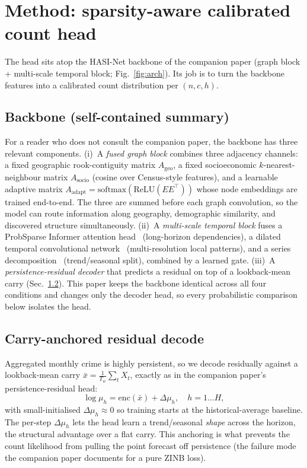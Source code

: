 \documentclass[11pt,conference]{IEEEtran}
\newcommand{\Ageo}{A_{\mathrm{geo}}}
\newcommand{\Asocio}{A_{\mathrm{socio}}}
\newcommand{\Aadapt}{A_{\mathrm{adapt}}}
\begin{document}
\section{Method: sparsity-aware calibrated count head}\label{sec:method}
The head sits atop the HASI-Net backbone of the companion paper (graph block +
multi-scale temporal block; Fig.~\ref{fig:arch}). Its job is to turn the backbone
features into a calibrated count distribution per $(n,c,h)$.

\subsection{Backbone (self-contained summary)}\label{sec:backbone}
For a reader who does not consult the companion paper, the backbone has three
relevant components. (i)~A \emph{fused graph block} combines three adjacency
channels: a fixed geographic rook-contiguity matrix $\Ageo$, a fixed
socioeconomic $k$-nearest-neighbour matrix $\Asocio$ (cosine over Census-style
features), and a learnable adaptive matrix $\Aadapt=\mathrm{softmax}(\mathrm{ReLU}(EE^\top))$
whose node embeddings are trained end-to-end. The three are summed before each
graph convolution, so the model can route information along geography, demographic
similarity, and discovered structure simultaneously. (ii)~A \emph{multi-scale
temporal block} fuses a ProbSparse Informer attention head~\cite{zhou2021informer}
(long-horizon dependencies), a dilated temporal convolutional
network~\cite{bai2018tcn} (multi-resolution local patterns), and a series
decomposition~\cite{zeng2023dlinear} (trend/seasonal split), combined by a learned
gate. (iii)~A \emph{persistence-residual decoder} that predicts a residual on top
of a lookback-mean carry (Sec.~\ref{sec:carry}). This paper keeps the backbone
identical across all four conditions and changes only the decoder head, so every
probabilistic comparison below isolates the head.

\subsection{Carry-anchored residual decode}\label{sec:carry}
Aggregated monthly crime is highly persistent, so we decode residually against a
lookback-mean carry $\bar x=\tfrac{1}{T_w}\sum_t X_t$, exactly as in the companion
paper's persistence-residual head:
\begin{equation}\label{eq:carry}
  \log\mu_{h} = \mathrm{enc}(\bar x) + \Delta\mu_{h},\quad h=1\ldots H,
\end{equation}
with small-initialised $\Delta\mu_h\!\approx\!0$ so training starts at the
historical-average baseline. The per-step $\Delta\mu_h$ lets the head learn a
trend/seasonal \emph{shape} across the horizon, the structural advantage over a
flat carry. This anchoring is what prevents the count likelihood from pulling the
point forecast off persistence (the failure mode the companion paper documents for
a pure ZINB loss).
\end{document}
